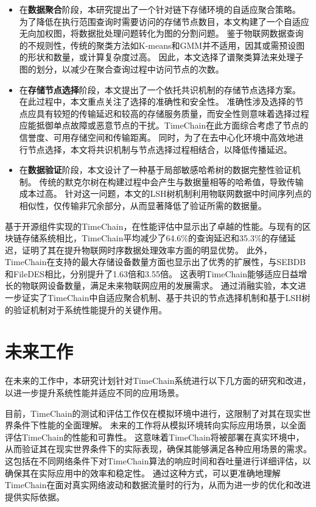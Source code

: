 \begin{itemize}
    \item 在\textbf{数据聚合}阶段，本研究提出了一个针对链下存储环境的自适应聚合策略。
    为了降低在执行范围查询时需要访问的存储节点数目，本文构建了一个自适应无向加权图，将数据批处理问题转化为图的分割问题。
    鉴于物联网数据查询的不规则性，传统的聚类方法如K-means和GMM并不适用，因其或需预设图的形状和数量，或计算复杂度过高。
    因此，本文选择了谱聚类算法来处理子图的划分，以减少在聚合查询过程中访问节点的次数。
    \item 在\textbf{存储节点选择}阶段，本文提出了一个依托共识机制的存储节点选择方案。
    在此过程中，本文重点关注了选择的准确性和安全性。
    准确性涉及选择的节点应具有较短的传输延迟和较高的存储服务质量，而安全性则意味着选择过程应能抵御单点故障或恶意节点的干扰。TimeChain在此方面综合考虑了节点的信誉度、可用存储空间和传输距离。
    同时，为了在去中心化环境中高效地进行节点选择，本文将共识机制与节点选择过程相结合，以降低传播延迟。
    \item 在\textbf{数据验证}阶段，本文设计了一种基于局部敏感哈希树的数据完整性验证机制。
    传统的默克尔树在构建过程中会产生与数据量相等的哈希值，导致传输成本过高。
    针对这一问题，本文的LSH树机制利用物联网数据中时间序列点的相似性，仅传输非冗余部分，从而显著降低了验证所需的数据量。
\end{itemize}

基于开源组件实现的TimeChain，在性能评估中显示出了卓越的性能。与现有的区块链存储系统相比，TimeChain平均减少了64.6\%的查询延迟和35.3\%的存储延迟，证明了其在提升物联网时序数据处理效率方面的明显优势。
此外，TimeChain在支持的最大存储设备数量方面也显示出了优秀的扩展性，与SEBDB和FileDES相比，分别提升了1.63倍和3.55倍。
这表明TimeChain能够适应日益增长的物联网设备数量，满足未来物联网应用的发展需求。
通过消融实验，本文进一步证实了TimeChain中自适应聚合机制、基于共识的节点选择机制和基于LSH树的验证机制对于系统性能提升的关键作用。

\section{未来工作}
在未来的工作中，本研究计划针对TimeChain系统进行以下几方面的研究和改进，以进一步提升系统性能并适应不同的应用场景。

目前，TimeChain的测试和评估工作仅在模拟环境中进行，这限制了对其在现实世界条件下性能的全面理解。
未来的工作将从模拟环境转向实际应用场景，以全面评估TimeChain的性能和可靠性。
这意味着TimeChain将被部署在真实环境中，从而验证其在现实世界条件下的实际表现，确保其能够满足各种应用场景的需求。
这包括在不同网络条件下对TimeChain算法的响应时间和吞吐量进行详细评估，以确保其在实际应用中的效率和稳定性。
通过这种方式，可以更准确地理解TimeChain在面对真实网络波动和数据流量时的行为，从而为进一步的优化和改进提供实际依据。

